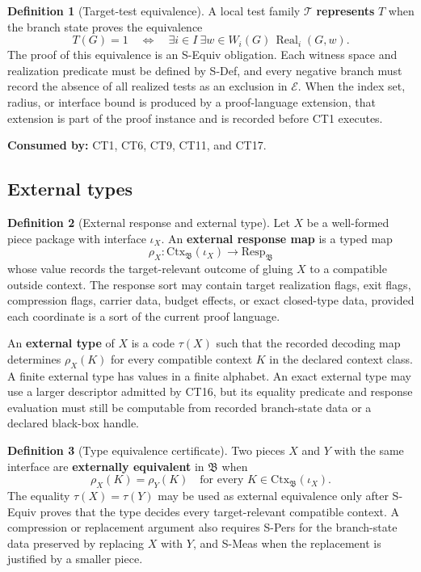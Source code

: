 \documentclass[
  11pt,
]{article}
\theoremstyle{definition}
\newtheorem{definition}{Definition}[section]
\begin{document}
\begin{definition}[Target-test equivalence]\label{def:target-test-equivalence}
A local test family \(\mathcal T\) \textbf{represents} \(T\) when the
branch state proves the equivalence
\[
T(G)=1
\quad\Longleftrightarrow\quad
\exists i\in I\ \exists w\in W_i(G)\,
  \operatorname{Real}_i(G,w).
\]
The proof of this equivalence is an S-Equiv obligation.  Each witness
space and realization predicate must be defined by S-Def, and every
negative branch must record the absence of all realized tests as an
exclusion in \(\mathcal E\).  When the index set, radius, or interface
bound is produced by a proof-language extension, that extension is part
of the proof instance and is recorded before CT1 executes.
\end{definition}

\noindent\textbf{Consumed by:} CT1, CT6, CT9, CT11, and CT17.

\subsection{External types}\label{data-external-types}
\begin{definition}[External response and external type]\label{def:external-type}
Let \(X\) be a well-formed piece package with interface \(\iota_X\).  An
\textbf{external response map} is a typed map
\[
\rho_X:\mathrm{Ctx}_{\mathfrak B}(\iota_X)\longrightarrow
\mathrm{Resp}_{\mathfrak B}
\]
whose value records the target-relevant outcome of gluing \(X\) to a
compatible outside context.  The response sort may contain target
realization flags, exit flags, compression flags, carrier data, budget
effects, or exact closed-type data, provided each coordinate is a sort
of the current proof language.

An \textbf{external type} of \(X\) is a code \(\tau(X)\) such that the
recorded decoding map determines \(\rho_X(K)\) for every compatible
context \(K\) in the declared context class.  A finite external type has
values in a finite alphabet.  An exact external type may use a larger
descriptor admitted by CT16, but its equality predicate and response
evaluation must still be computable from recorded branch-state data or a
declared black-box handle.
\end{definition}

\begin{definition}[Type equivalence certificate]\label{def:type-equivalence-certificate}
Two pieces \(X\) and \(Y\) with the same interface are
\textbf{externally equivalent} in \(\mathfrak B\) when
\[
\rho_X(K)=\rho_Y(K)
\quad\text{for every }K\in\mathrm{Ctx}_{\mathfrak B}(\iota_X).
\]
The equality \(\tau(X)=\tau(Y)\) may be used as external equivalence
only after S-Equiv proves that the type decides every target-relevant
compatible context.  A compression or replacement argument also requires
S-Pers for the branch-state data preserved by replacing \(X\) with
\(Y\), and S-Meas when the replacement is justified by a smaller piece.
\end{definition}
\end{document}
